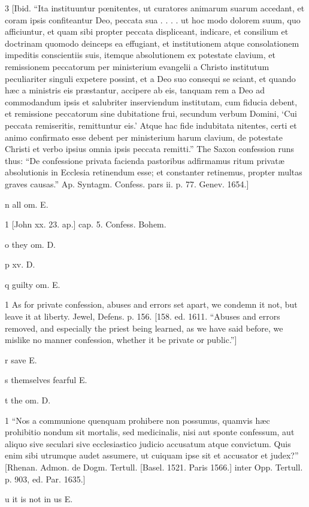 3
[Ibid. “Ita instituuntur pœnitentes, ut curatores animarum suarum accedant, et coram ipsis confiteantur Deo, peccata sua . . . . ut hoc modo dolorem suum, quo afficiuntur, et quam sibi propter peccata displiceant, indicare, et consilium et doctrinam quomodo deinceps ea effugiant, et institutionem atque consolationem impeditis conscientiis suis, itemque absolutionem ex potestate clavium, et remissionem peccatorum per ministerium evangelii a Christo institutum peculiariter singuli expetere possint, et a Deo suo consequi se sciant, et quando hæc a ministris eis præstantur, accipere ab eis, tanquam rem a Deo ad commodandum ipsis et salubriter inserviendum institutam, cum fiducia debent, et remissione peccatorum sine dubitatione frui, secundum verbum Domini, ‘Cui peccata remiseritis, remittuntur eis.’ Atque hac fide indubitata nitentes, certi et animo confirmato esse debent per ministerium harum clavium, de potestate Christi et verbo ipsius omnia ipsis peccata remitti.” The Saxon confession runs thus: “De confessione privata facienda pastoribus adfirmamus ritum privatæ absolutionis in Ecclesia retinendum esse; et constanter retinemus, propter multas graves causas.” Ap. Syntagm. Confess. pars ii. p. 77. Genev. 1654.]

n
all om. E.

1
[John xx. 23. ap.] cap. 5. Confess. Bohem.

o
they om. D.

p
xv. D.

q
guilty om. E.

1
As for private confession, abuses and errors set apart, we condemn it not, but leave it at liberty. Jewel, Defens. p. 156. [158. ed. 1611. “Abuses and errors removed, and especially the priest being learned, as we have said before, we mislike no manner confession, whether it be private or public.”]

r
save E.

s
themselves fearful E.

t
the om. D.

1
“Nos a communione quenquam prohibere non possumus, quamvis hæc prohibitio nondum sit mortalis, sed medicinalis, nisi aut sponte confessum, aut aliquo sive seculari sive ecclesiastico judicio accusatum atque convictum. Quis enim sibi utrumque audet assumere, ut cuiquam ipse sit et accusator et judex?” [Rhenan. Admon. de Dogm. Tertull. [Basel. 1521. Paris 1566.] inter Opp. Tertull. p. 903, ed. Par. 1635.]

u
it is not in us E.

